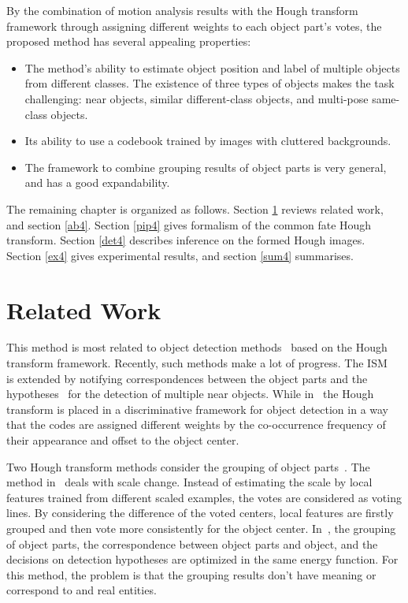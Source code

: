 By the combination of motion analysis results with the Hough transform framework through assigning different weights to each object part's votes, the proposed method has several appealing properties:
\begin{itemize}
\item {The method's ability to estimate object position and label of multiple objects from different classes. The existence of three types of objects makes the task challenging: near objects, similar different-class objects, and multi-pose same-class objects.}
\item {Its ability to use a codebook trained by images with cluttered backgrounds.}
\item {The framework to combine grouping results of object parts is very general, and has a good expandability.}
\end{itemize}

The remaining chapter is organized as follows. Section \ref{rw4} reviews related work, and section \ref{ab4}. Section \ref{pip4}  gives formalism of the common fate Hough transform. Section \ref{det4} describes inference on the formed Hough images. Section \ref{ex4} gives experimental results, and section \ref{sum4} summarises.

\section{Related Work}
\label{rw4}

 This method is most related to object detection methods~\citep{ac9,ac22,lb1,ac5,ac10,ac21} based on the Hough transform framework. Recently, such methods make a lot of progress. The ISM~\citep{lb1,ac5} is extended  by notifying correspondences between the object parts and the hypotheses~\citep{ac9} for the detection of multiple near objects. While in~\citep{ac6,ac10,ac7} the Hough transform is placed in a discriminative framework for object detection in a way that the codes are assigned different weights by the co-occurrence frequency of their appearance and offset to the object center.

Two Hough transform methods consider the grouping of object parts~\citep{ac26,ac25}. The method in~\citep{ac26} deals with scale change. Instead of estimating the scale by local features trained from different scaled examples, the votes are considered as voting lines. By considering the difference of the voted centers, local features are firstly grouped and then vote more consistently for the object center. In~\citep{ac25}, the grouping of object parts, the correspondence between object parts and object, and the decisions on detection hypotheses are optimized in the same energy function. For this method, the problem is that the grouping results don't have meaning or correspond to and real entities.

